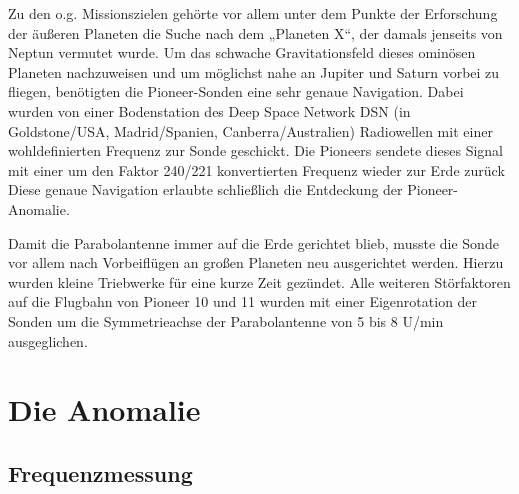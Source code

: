 \documentclass[a4paper,10pt]{article}
\begin{document}
Zu den o.g. Missionszielen gehörte vor allem unter dem Punkte der Erforschung der äußeren Planeten die Suche nach dem
„Planeten X“, der damals jenseits von Neptun vermutet wurde. Um das schwache Gravitationsfeld dieses ominösen Planeten
nachzuweisen und um möglichst nahe an Jupiter und Saturn vorbei zu fliegen, benötigten die Pioneer-Sonden eine sehr
genaue Navigation. Dabei wurden von einer Bodenstation des Deep Space Network DSN (in Goldstone/USA, Madrid/Spanien,
Canberra/Australien) Radiowellen mit einer wohldefinierten Frequenz zur Sonde geschickt. Die Pioneers sendete dieses
Signal mit einer um den Faktor 240/221 konvertierten Frequenz wieder zur Erde zurück\cite{Dittus2006} Diese genaue
Navigation erlaubte schließlich die Entdeckung der Pioneer-Anomalie. 

Damit die Parabolantenne immer auf die Erde gerichtet blieb, musste die Sonde vor allem nach Vorbeiflügen an großen
Planeten neu ausgerichtet werden. Hierzu wurden kleine Triebwerke für eine kurze Zeit gezündet. Alle weiteren
Störfaktoren auf die Flugbahn von Pioneer 10 und 11 wurden mit einer Eigenrotation der Sonden um die Symmetrieachse der
Parabolantenne von 5 bis 8 U/min ausgeglichen.


\section{Die Anomalie}
\subsection{Frequenzmessung}
\end{document}
